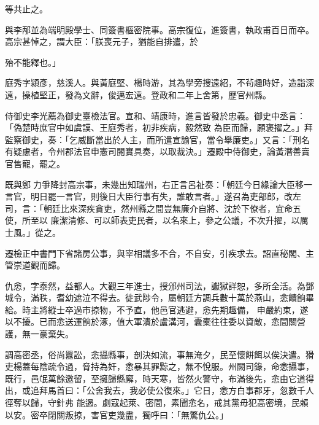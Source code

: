 \begin{pinyinscope}
  
   
  
 
 等共止之。



 
  
   
  
 
 與李邴並為端明殿學士、同簽書樞密院事。高宗復位，進簽書，執政甫百日而卒。高宗甚悼之，謂大臣：「朕喪元子，猶能自排遣，於
 
  
   
  
 
 殆不能釋也。」



 庭秀字潁彥，慈溪人。與黃庭堅、楊時游，其為學旁搜遠紹，不茍趣時好，造詣深遠，操植堅正，發為文辭，俊邁宏遠。登政和二年上舍第，歷官州縣。



 侍御史李光薦為御史臺檢法官。宣和、靖康時，進言皆發於忠義。御史中丞言：「偽楚時庶官中如虞謨、王庭秀者，初非疾病，毅然致
 為臣而歸，願褒擢之。」拜監察御史，奏：「乞威斷當出於人主，而所遣宣諭官，當令舉廉吏。」又言：「刑名有疑慮者，令州郡法官申憲司閱實具奏，以取裁決。」遷殿中侍御史，論黃潛善賣官售寵，罷之。



 既與鄭𣪝力爭降封高宗事，未幾出知瑞州，右正言呂祉奏：「朝廷今日緣論大臣移一言官，明日罷一言官，則後日大臣行事有失，誰敢言者。」遂召為吏部郎，改左司，言：「朝廷比來深疾貪吏，然州縣之間豈無廉介自將、沈於下僚者，宜命五使，所至以
 廉潔清修、可以師表吏民者，以名來上，參之公議，不次升擢，以厲士風。」從之。



 遷檢正中書門下省諸房公事，與宰相議多不合，不自安，引疾求去。詔直秘閣、主管崇道觀而歸。



 仇悆，字泰然，益都人。大觀三年進士，授邠州司法，讞獄詳恕，多所全活。為鄧城令，滿秩，耆幼遮泣不得去。徙武陟令，屬朝廷方調兵數十萬於燕山，悆饋餉畢給。時主將縱士卒過市掠物，不予直，他邑官逃避，悆先期趣備，
 申嚴約束，遂以不擾。已而悆送運餉於涿，值大軍潰於盧溝河，囊橐往往委以資敵，悆間關營護，無一豪棄失。



 調高密丞，俗尚囂訟，悆攝縣事，剖決如流，事無淹夕，民至懷餅餌以俟決遣。猾吏楊蓋每陰疏令過，脅持為奸，悆暴其罪黥之，無不悅服。州闕司錄，命悆攝事，既行，邑氓萬餘邀留，至擁歸縣廨，時天寒，皆然火警守，布滿後先，悆由它道得出，或追拜馬首曰：「公舍我去，我必使公復來。」它日，悆方白事郡牙，忽數千人徑奪以歸，守針弗
 能遏。劇寇起萊、密間，素聞悆名，戒其黨毋犯高密境，民賴以安。密卒閉關叛掠，害官吏幾盡，獨呼曰：「無驚仇公。」




\end{pinyinscope}
